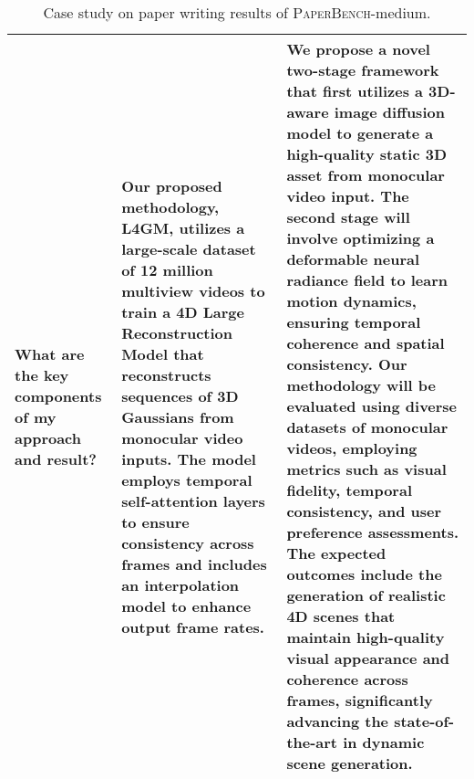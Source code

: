 \begin{table*}[htbp]
\begin{tabular}{p{3cm}p{6cm}p{6cm}}
What are the key components of my approach and result? & 
Our proposed methodology, L4GM, utilizes a large-scale dataset of 12 million multiview videos to train a 4D Large Reconstruction Model that reconstructs sequences of 3D Gaussians from monocular video inputs. The model employs temporal self-attention layers to ensure consistency across frames and includes an interpolation model to enhance output frame rates. &
We propose a novel two-stage framework that first utilizes a 3D-aware image diffusion model to generate a high-quality static 3D asset from monocular video input. The second stage will involve optimizing a deformable neural radiance field to learn motion dynamics, ensuring temporal coherence and spatial consistency. Our methodology will be evaluated using diverse datasets of monocular videos, employing metrics such as visual fidelity, temporal consistency, and user preference assessments. The expected outcomes include the generation of realistic 4D scenes that maintain high-quality visual appearance and coherence across frames, significantly advancing the state-of-the-art in dynamic scene generation.
\\
\bottomrule[1.1pt]
\end{tabular}
\caption{Case study on paper writing results of \textsc{PaperBench}-medium.}
\label{tab:paperbench mid}
\end{table*}

